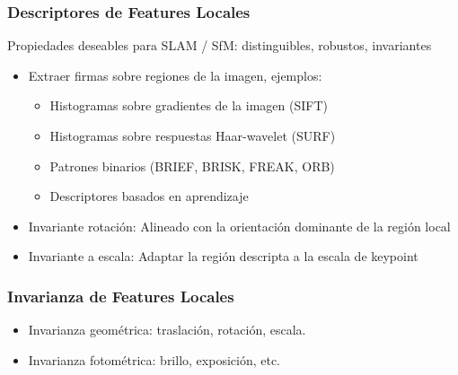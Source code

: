 \begin{frame}
    \frametitle{Descriptores de Features Locales}
    \footnotesize
    
    Propiedades deseables para SLAM / SfM: distinguibles, robustos, invariantes
    \begin{itemize}
        \item Extraer firmas sobre regiones de la imagen, ejemplos:
        \begin{itemize}
            \item Histogramas sobre gradientes de la imagen (SIFT)
            \item Histogramas sobre respuestas Haar-wavelet (SURF)
            \item Patrones binarios (BRIEF, BRISK, FREAK, ORB)
            \item Descriptores basados en aprendizaje
        \end{itemize}
        \item Invariante rotación: Alineado con la orientación dominante de la región local
        \item Invariante a escala: Adaptar la región descripta a la escala de keypoint
    \end{itemize}

    \begin{figure}[!h]
        \hspace{1cm}
    \end{figure}
    
\end{frame}

\begin{frame}
    \frametitle{Invarianza de Features Locales}
    \footnotesize
    
    \begin{itemize}
        \item Invarianza geométrica: traslación, rotación, escala.
        \item Invarianza fotométrica: brillo, exposición, etc.
    \end{itemize}
     

\end{frame}

